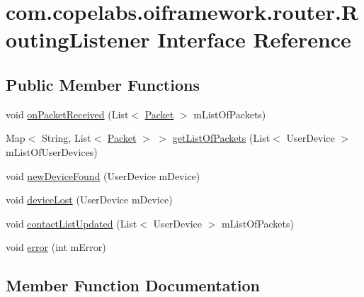 \hypertarget{interfacecom_1_1copelabs_1_1oiframework_1_1router_1_1_routing_listener}{}\section{com.\+copelabs.\+oiframework.\+router.\+Routing\+Listener Interface Reference}
\label{interfacecom_1_1copelabs_1_1oiframework_1_1router_1_1_routing_listener}
\subsection*{Public Member Functions}
\begin{DoxyCompactItemize}
\item 
void \hyperlink{interfacecom_1_1copelabs_1_1oiframework_1_1router_1_1_routing_listener_a2f49c92e34e64a11caa4b37ced010947}{on\+Packet\+Received} (List$<$ \hyperlink{classcom_1_1copelabs_1_1oiframework_1_1contentmanager_1_1_packet}{Packet} $>$ m\+List\+Of\+Packets)
\item 
Map$<$ String, List$<$ \hyperlink{classcom_1_1copelabs_1_1oiframework_1_1contentmanager_1_1_packet}{Packet} $>$ $>$ \hyperlink{interfacecom_1_1copelabs_1_1oiframework_1_1router_1_1_routing_listener_aae99454a61f8e1e1a18049f8c4a8fcf2}{get\+List\+Of\+Packets} (List$<$ User\+Device $>$ m\+List\+Of\+User\+Devices)
\item 
void \hyperlink{interfacecom_1_1copelabs_1_1oiframework_1_1router_1_1_routing_listener_a0c81da81d2671a6391f9d0bd19fa6358}{new\+Device\+Found} (User\+Device m\+Device)
\item 
void \hyperlink{interfacecom_1_1copelabs_1_1oiframework_1_1router_1_1_routing_listener_a572b1fd128461739748b038086fa411d}{device\+Lost} (User\+Device m\+Device)
\item 
void \hyperlink{interfacecom_1_1copelabs_1_1oiframework_1_1router_1_1_routing_listener_aa98938a27b5e9efe5be1f4309e008302}{contact\+List\+Updated} (List$<$ User\+Device $>$ m\+List\+Of\+Packets)
\item 
void \hyperlink{interfacecom_1_1copelabs_1_1oiframework_1_1router_1_1_routing_listener_a03309a95f954512e20d607a2a3beb614}{error} (int m\+Error)
\end{DoxyCompactItemize}


\subsection{Member Function Documentation}
\hypertarget{interfacecom_1_1copelabs_1_1oiframework_1_1router_1_1_routing_listener_aa98938a27b5e9efe5be1f4309e008302}{}
